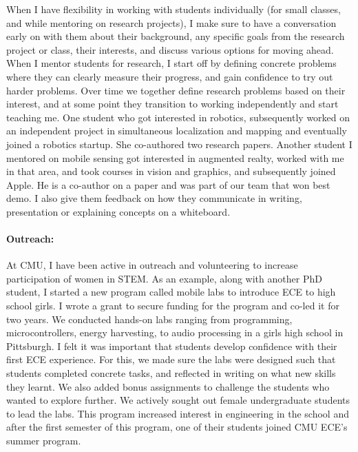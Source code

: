 \documentclass[10pt]{article}
\begin{document}
When I have flexibility in working with students individually (for small classes, and while mentoring on research projects), I make sure to have a conversation early on with them about their background, any specific goals from the research project or class, their interests, and discuss various options for moving ahead. %
When I mentor students for research, I start off by defining concrete problems where they can clearly measure their progress, and gain confidence to try out harder problems. Over time we together define research problems based on their interest, and at some point they transition to working independently and start teaching me. One student who got interested in robotics, subsequently worked on an independent project in simultaneous localization and mapping and eventually joined a robotics startup. She co-authored two research papers. Another student I mentored on mobile sensing got interested in augmented realty, worked with me in that area, and took courses in vision and graphics, and subsequently joined Apple. He is a co-author on a paper and was part of our team that won best demo. I also give them feedback on how they communicate in writing, presentation or explaining concepts on a whiteboard.


 \paragraph{Outreach: } 
 At CMU, I have been active in outreach and volunteering to increase participation of women in STEM. %
As an example, along with another PhD student, I started a new program called mobile labs to introduce ECE to high school girls. I wrote a grant to secure funding for the program and co-led it for two years. We conducted hands-on labs ranging from programming, microcontrollers, energy harvesting, to audio processing in a girls high school in Pittsburgh. I felt it was important that students develop confidence with their first ECE experience. For this, we made sure the labs were designed such that students completed concrete tasks, and reflected in writing on what new skills they learnt. We also added bonus assignments to challenge the students who wanted to explore further. We actively sought out female undergraduate students to lead the labs. This program increased interest in engineering in the school and after the first semester of this program, one of their students joined CMU ECE's summer program.\\
\end{document}
